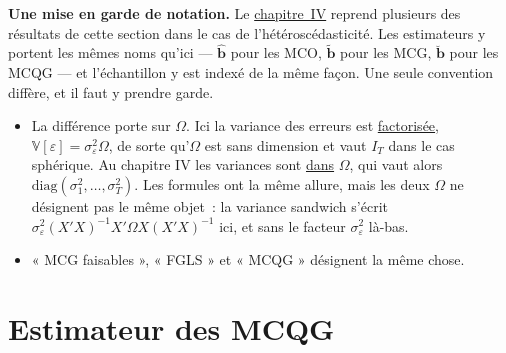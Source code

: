 \documentclass[10pt,a4paper]{article}
\newcommand{\siteurl}{https://le-mans.adjemian.eu/econometrics}
\newcommand{\chapref}[2]{\href{\siteurl/chapitre-#1.pdf}{chapitre~#2}}
\theoremstyle{definition}
\renewcommand{\newline}{\unskip\par\vspace{1.5pt}}
\begin{document}
\begin{notes}

  \textbf{Une mise en garde de notation.} Le \chapref{4}{IV} reprend plusieurs des
  résultats de cette section dans le cas de l'hétéroscédasticité. Les estimateurs y
  portent les mêmes noms qu'ici — $\hat{\mathbf b}$ pour les MCO, $\tilde{\mathbf b}$
  pour les MCG, $\breve{\mathbf b}$ pour les MCQG — et l'échantillon y est indexé de
  la même façon. Une seule convention diffère, et il faut y prendre garde.

  \bigskip

  \begin{itemize}

  \item[\dbend] La différence porte sur $\Omega$. Ici la variance des erreurs est
    \underline{factorisée}, $\mathbb V[\varepsilon]=\sigma_{\varepsilon}^2\Omega$, de
    sorte qu'$\Omega$ est sans dimension et vaut $I_T$ dans le cas sphérique. Au
    chapitre IV les variances sont \underline{dans} $\Omega$, qui vaut alors
    $\mathrm{diag}(\sigma_1^2,\dots,\sigma_T^2)$. Les formules ont la même allure, mais
    les deux $\Omega$ ne désignent pas le même objet~: la variance sandwich s'écrit
    $\sigma_{\varepsilon}^2(X'X)^{-1}X'\Omega X(X'X)^{-1}$ ici, et sans le facteur
    $\sigma_{\varepsilon}^2$ là-bas.\newline

  \item « MCG faisables », « FGLS » et « MCQG » désignent la même chose.

  \end{itemize}

\end{notes}


\section{Estimateur des MCQG}
\end{document}
